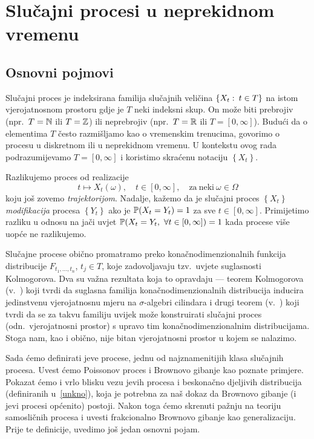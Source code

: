 \documentclass[main.tex]{subfiles}
\begin{document}
\nocite{*}

\chapter{Slučajni procesi u neprekidnom vremenu} \label{ch:sp}
\section{Osnovni pojmovi} \label{sec:sp-osnovni}
Slučajni proces je indeksirana familija slučajnih veličina \( \left\{ X_t \st t \in T \right\} \) na istom vjerojatnosnom prostoru
gdje je \( T \) neki indeksni skup. On može biti prebrojiv (npr.\ \( T = \N \) ili \( T = \Z \))
ili neprebrojiv (npr.\ \( T = \R \) ili \( T = \left[ 0, \infty \right]  \)). Budući da o
elementima \( T \) često razmišljamo kao o vremenskim trenucima, govorimo o procesu u diskretnom
ili u neprekidnom vremenu.
U kontekstu ovog rada podrazumijevamo \( T = \left[ 0,\infty \right] \) i koristimo skraćenu notaciju
\( \left\{ X_t \right\} \).

Razlikujemo proces od realizacije
\[ t \mapsto X_t(\omega), \quad t \in \left[ 0,\infty \right], \quad \mathrm{za \ neki} \ \omega \in \Omega \]
koju još zovemo \emph{trajektorijom}. Nadalje, kažemo da je slučajni proces \( \left\{ X_t \right\} \) \emph{modifikacija} procesa
\( \left\{ Y_t \right\} \) ako je \( \P(X_t = Y_t) = 1 \) za sve \( t \in \left[ 0,\infty \right] \). Primijetimo razliku u odnosu
na jači uvjet \( \P(X_t = Y_t,\ \forall t \in \left[ 0,\infty \right]) = 1 \) kada procese više uopće ne razlikujemo.

Slučajne procese obično promatramo preko konačnodimenzionalnih funkcija distribucije
\( F_{t_1, \ldots, t_n} \), \( t_j \in T \), koje zadovoljavaju tzv.\ uvjete suglasnosti Kolmogorova.
Dva su važna rezultata koja to opravdaju --- teorem Kolmogorova (v.~\cite[tm.\ 9.6.]{sarapa}) koji tvrdi
da suglasna familija konačnodimenzionalnih distribucija inducira je\-din\-stve\-nu vjerojatnosnu mjeru na \( \sigma \)-algebri cilindara
i drugi teorem (v.~\cite[tm.\ 9.7.]{sarapa}) koji tvrdi da se za takvu familiju uvijek može konstruirati
slučajni proces (odn.\ vjerojatnosni prostor) s upravo tim konačnodimenzionalnim distribucijama. Stoga nam, kao i obično,
nije bitan vjerojatnosni prostor u kojem se nalazimo.

Sada ćemo definirati \levy jeve procese, jednu od najznamenitijih klasa slučajnih procesa. Uvest ćemo Poissonov proces
i Brownovo gibanje kao poznate primjere. Pokazat ćemo i vrlo blisku vezu \levy jevih procesa i beskonačno djeljivih distribucija (definiranih u~\ref{unkno}), koja
je potrebna za naš dokaz da Brownovo gibanje (i \levy jevi procesi općenito) postoji. Nakon toga ćemo skrenuti pažnju na teoriju samosličnih procesa i uvesti
frakcionalno Brownovo gibanje kao generalizaciju. Prije te definicije, uvedimo još jedan osnovni pojam.
\end{document}
